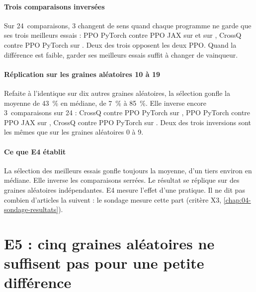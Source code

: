 
\paragraph{Trois comparaisons inversées}
Sur 24~comparaisons, 3 changent de sens quand chaque programme ne garde que ses trois meilleurs essais :
PPO PyTorch contre PPO JAX sur  et sur , CrossQ contre PPO PyTorch sur
. Deux des trois opposent les deux PPO. Quand la différence est faible, garder ses
meilleurs essais suffit à changer de vainqueur.


\paragraph{Réplication sur les graines aléatoires 10 à 19}
Refaite à l'identique sur dix autres graines aléatoires, la sélection gonfle la moyenne de 43~\% en médiane, de
7~\% à 85~\%. Elle inverse encore 3~comparaisons sur 24 : CrossQ contre PPO PyTorch sur , PPO
PyTorch contre PPO JAX sur , CrossQ contre PPO PyTorch sur . Deux des trois
inversions sont les mêmes que sur les graines aléatoires 0 à 9.

\paragraph{Ce que E4 établit}
La sélection des meilleurs essais gonfle toujours la moyenne, d'un tiers environ en médiane. Elle inverse les
comparaisons serrées. Le résultat se réplique sur des graines aléatoires indépendantes. E4 mesure l'effet d'une pratique.
Il ne dit pas combien d'articles la suivent : le sondage mesure cette part (critère X3, \cref{chap:04-sondage-resultats}).

\section{E5 : cinq graines aléatoires ne suffisent pas pour une petite différence}\label{sec:e5}

